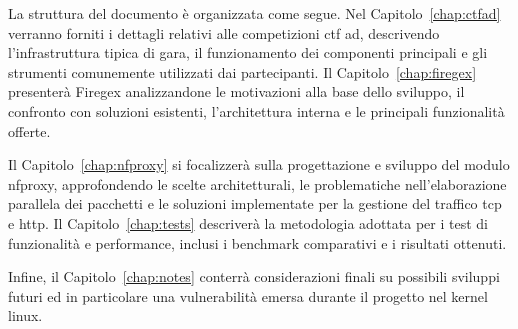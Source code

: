 La struttura del documento è organizzata come segue. Nel Capitolo~\ref{chap:ctfad} verranno forniti i dettagli relativi alle competizioni \gls{ctf} \gls{ad}, descrivendo l'infrastruttura tipica di gara, il funzionamento dei componenti principali e gli strumenti comunemente utilizzati dai partecipanti. Il Capitolo~\ref{chap:firegex} presenterà Firegex analizzandone le motivazioni alla base dello sviluppo, il confronto con soluzioni esistenti, l'architettura interna e le principali funzionalità offerte.

Il Capitolo~\ref{chap:nfproxy} si focalizzerà sulla progettazione e sviluppo del modulo nfproxy, approfondendo le scelte architetturali, le problematiche nell'elaborazione parallela dei pacchetti e le soluzioni implementate per la gestione del traffico \gls{tcp} e \gls{http}. Il Capitolo~\ref{chap:tests} descriverà la metodologia adottata per i test di funzionalità e performance, inclusi i benchmark comparativi e i risultati ottenuti.

Infine, il Capitolo~\ref{chap:notes} conterrà considerazioni finali su possibili sviluppi futuri ed in particolare una vulnerabilità emersa durante il progetto nel kernel linux.


